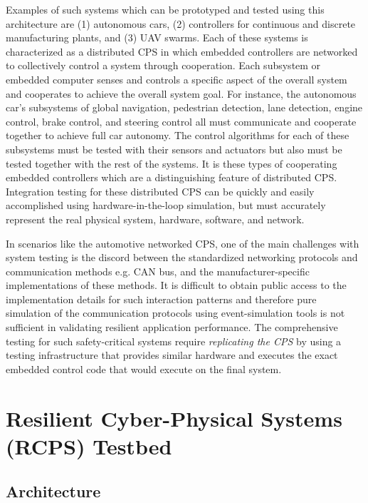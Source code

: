 Examples of such systems which can be prototyped and tested using this architecture are (1) autonomous cars, (2) controllers for continuous and discrete manufacturing plants, and (3) UAV swarms.  Each of these systems is characterized as a distributed CPS in which embedded controllers are networked to collectively control a system through cooperation.  Each subsystem or embedded computer senses and controls a specific aspect of the overall system and cooperates to achieve the overall system goal.  For instance, the autonomous car's subsystems of global navigation, pedestrian detection, lane detection, engine control, brake control, and steering control all must communicate and cooperate together to achieve full car autonomy.  The control algorithms for each of these subsystems must be tested with their sensors and actuators but also must be tested together with the rest of the systems.  It is these types of cooperating embedded controllers which are a distinguishing feature of distributed CPS.  Integration testing for these distributed CPS can be quickly and easily accomplished using hardware-in-the-loop simulation, but must accurately represent the real physical system, hardware, software, and network. 

In scenarios like the automotive networked CPS, one of the main challenges with system testing is the discord between the standardized networking protocols and communication methods e.g. CAN bus, and the manufacturer-specific implementations of these methods. It is difficult to obtain public access to the implementation details for such interaction patterns and therefore pure simulation of the communication protocols using event-simulation tools  is not sufficient in validating resilient application performance. The comprehensive testing for such safety-critical systems require \emph{replicating the CPS} by using a testing infrastructure that provides similar hardware and executes the exact embedded control code that would execute on the final system. 

\section{Resilient Cyber-Physical Systems (RCPS) Testbed}

\subsection{Architecture}

